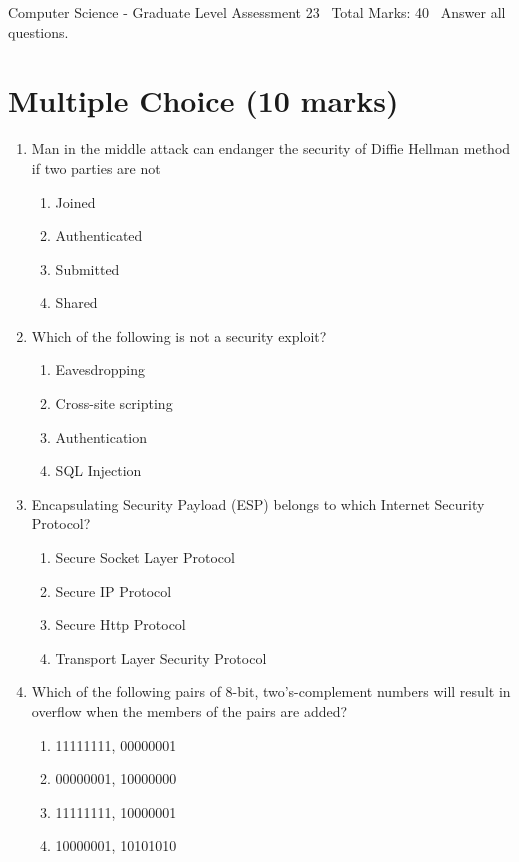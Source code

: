 \documentclass[12pt]{article}
\begin{document}
\begin{center}
Computer Science - Graduate Level Assessment 23 \
Total Marks: 40 \
Answer all questions.
\end{center}

\section*{Multiple Choice (10 marks)}
\begin{enumerate}[label=\arabic*.]
\item Man in the middle attack can endanger the security of Diffie Hellman method if two parties are not
\begin{enumerate}[label=(\alph*)]
    \item Joined
    \item Authenticated
    \item Submitted
    \item Shared
\end{enumerate}
\item Which of the following is not a security exploit?
\begin{enumerate}[label=(\alph*)]
    \item Eavesdropping
    \item Cross-site scripting
    \item Authentication
    \item SQL Injection
\end{enumerate}
\item Encapsulating Security Payload (ESP) belongs to which Internet Security Protocol?
\begin{enumerate}[label=(\alph*)]
    \item Secure Socket Layer Protocol
    \item Secure IP Protocol
    \item Secure Http Protocol
    \item Transport Layer Security Protocol
\end{enumerate}
\item Which of the following pairs of 8-bit, two's-complement numbers will result in overflow when the members of the pairs are added?
\begin{enumerate}[label=(\alph*)]
    \item 11111111, 00000001
    \item 00000001, 10000000
    \item 11111111, 10000001
    \item 10000001, 10101010

\end{enumerate}
\end{enumerate}
\end{document}
